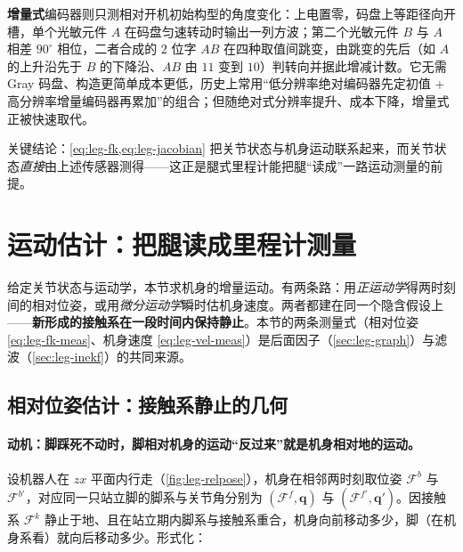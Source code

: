 \noindent \textbf{增量式}编码器则只测相对开机初始构型的角度变化：上电置零，码盘上等距径向开槽，单个光敏元件 $A$ 在码盘匀速转动时输出一列方波；第二个光敏元件 $B$ 与 $A$ 相差 $90^\circ$ 相位，二者合成的 $2$ 位字 $AB$ 在四种取值间跳变，由跳变的先后（如 $A$ 的上升沿先于 $B$ 的下降沿、$AB$ 由 $11$ 变到 $10$）判转向并据此增减计数。它无需 Gray 码盘、构造更简单成本更低，历史上常用“低分辨率绝对编码器先定初值 + 高分辨率增量编码器再累加”的组合；但随绝对式分辨率提升、成本下降，增量式正被快速取代。

关键结论：\cref{eq:leg-fk,eq:leg-jacobian} 把关节状态与机身运动联系起来，而关节状态\emph{直接}由上述传感器测得——这正是腿式里程计能把腿“读成”一路运动测量的前提。

\section{运动估计：把腿读成里程计测量}
\label{sec:leg-motion}

给定关节状态与运动学，本节求机身的增量运动。有两条路：用\emph{正运动学}得两时刻间的相对位姿，或用\emph{微分运动学}瞬时估机身速度。两者都建在同一个隐含假设上——\textbf{新形成的接触系在一段时间内保持静止}。本节的两条测量式（相对位姿 \cref{eq:leg-fk-meas}、机身速度 \cref{eq:leg-vel-meas}）是后面因子（\cref{sec:leg-graph}）与滤波（\cref{sec:leg-inekf}）的共同来源。

\subsection{相对位姿估计：接触系静止的几何}
\label{subsec:leg-relpose}

\paragraph{动机：脚踩死不动时，脚相对机身的运动“反过来”就是机身相对地的运动。}
设机器人在 $zx$ 平面内行走（\cref{fig:leg-relpose}），机身在相邻两时刻取位姿 $\mathcal{F}^b$ 与 $\mathcal{F}^{b'}$，对应同一只站立脚的脚系与关节角分别为 $(\mathcal{F}^f,\mathbf{q})$ 与 $(\mathcal{F}^{f'},\mathbf{q}')$。因接触系 $\mathcal{F}^k$ 静止于地、且在站立期内脚系与接触系重合，机身向前移动多少，脚（在机身系看）就向后移动多少。形式化：

